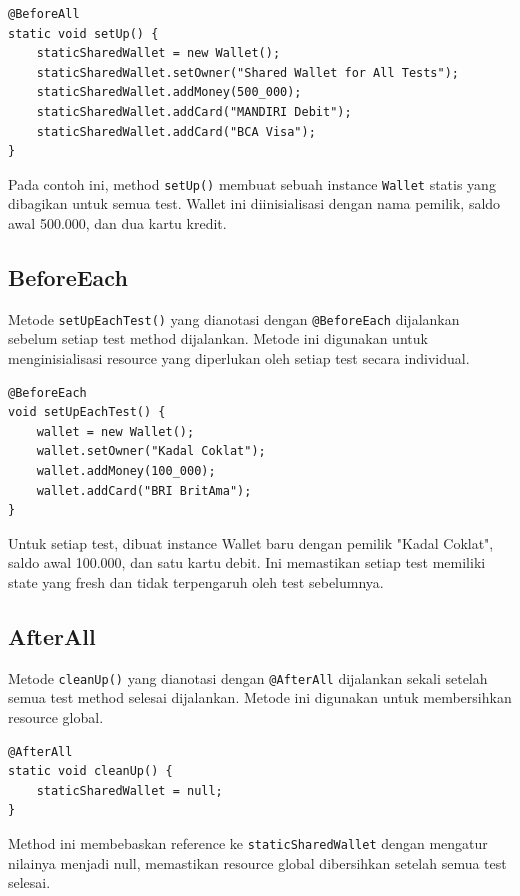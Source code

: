 \documentclass[a4paper,oneside,11pt]{book}
\begin{document}
\begin{lstlisting}[style=javastyle]
@BeforeAll
static void setUp() {
    staticSharedWallet = new Wallet();
    staticSharedWallet.setOwner("Shared Wallet for All Tests");
    staticSharedWallet.addMoney(500_000);
    staticSharedWallet.addCard("MANDIRI Debit");
    staticSharedWallet.addCard("BCA Visa");
}
\end{lstlisting}

Pada contoh ini, method \texttt{setUp()} membuat sebuah instance \texttt{Wallet} statis yang dibagikan untuk semua test. Wallet ini diinisialisasi dengan nama pemilik, saldo awal 500.000, dan dua kartu kredit.

\subsection{BeforeEach}
Metode \texttt{setUpEachTest()} yang dianotasi dengan \texttt{@BeforeEach} dijalankan sebelum setiap test method dijalankan. Metode ini digunakan untuk menginisialisasi resource yang diperlukan oleh setiap test secara individual.

\begin{lstlisting}[style=javastyle]
@BeforeEach
void setUpEachTest() {
    wallet = new Wallet();
    wallet.setOwner("Kadal Coklat");
    wallet.addMoney(100_000);
    wallet.addCard("BRI BritAma");
}
\end{lstlisting}

Untuk setiap test, dibuat instance Wallet baru dengan pemilik "Kadal Coklat", saldo awal 100.000, dan satu kartu debit. Ini memastikan setiap test memiliki state yang fresh dan tidak terpengaruh oleh test sebelumnya.

\subsection{AfterAll}
Metode \texttt{cleanUp()} yang dianotasi dengan \texttt{@AfterAll} dijalankan sekali setelah semua test method selesai dijalankan. Metode ini digunakan untuk membersihkan resource global.

\begin{lstlisting}[style=javastyle]
@AfterAll
static void cleanUp() {
    staticSharedWallet = null;
}
\end{lstlisting}

Method ini membebaskan reference ke \texttt{staticSharedWallet} dengan mengatur nilainya menjadi null, memastikan resource global dibersihkan setelah semua test selesai.
\end{document}
